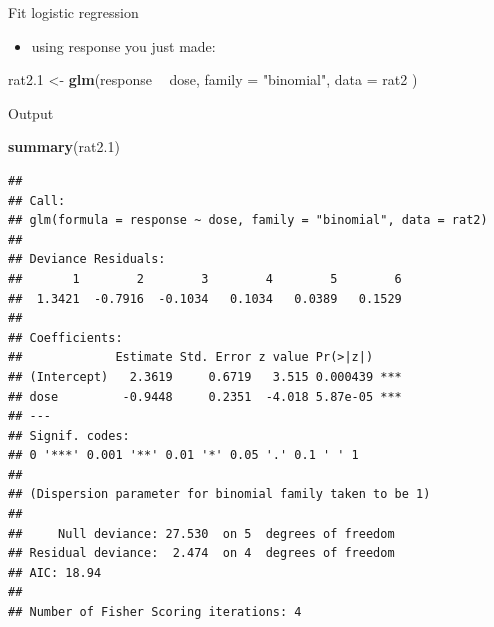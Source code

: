 \documentclass[
  ignorenonframetext,
]{beamer}
\newenvironment{Shaded}{\begin{snugshade}}{\end{snugshade}}
\newcommand{\DataTypeTok}[1]{\textcolor[rgb]{0.13,0.29,0.53}{#1}}
\newcommand{\FloatTok}[1]{\textcolor[rgb]{0.00,0.00,0.81}{#1}}
\newcommand{\KeywordTok}[1]{\textcolor[rgb]{0.13,0.29,0.53}{\textbf{#1}}}
\newcommand{\NormalTok}[1]{#1}
\newcommand{\OperatorTok}[1]{\textcolor[rgb]{0.81,0.36,0.00}{\textbf{#1}}}
\newcommand{\StringTok}[1]{\textcolor[rgb]{0.31,0.60,0.02}{#1}}
\providecommand{\tightlist}{%
  \setlength{\itemsep}{0pt}\setlength{\parskip}{0pt}}
\begin{document}
\begin{frame}[fragile]{Fit logistic regression}
\protect\hypertarget{fit-logistic-regression}{}

\begin{itemize}
\tightlist
\item
  using response you just made:
\end{itemize}

\begin{Shaded}
\begin{Highlighting}[]
\NormalTok{rat2}\FloatTok{.1}\NormalTok{ <-}\StringTok{ }\KeywordTok{glm}\NormalTok{(response }\OperatorTok{~}\StringTok{ }\NormalTok{dose,}
  \DataTypeTok{family =} \StringTok{"binomial"}\NormalTok{,}
  \DataTypeTok{data =}\NormalTok{ rat2}
\NormalTok{)}
\end{Highlighting}
\end{Shaded}

\end{frame}

\begin{frame}[fragile]{Output}
\protect\hypertarget{output-2}{}

\scriptsize

\begin{Shaded}
\begin{Highlighting}[]
\KeywordTok{summary}\NormalTok{(rat2}\FloatTok{.1}\NormalTok{)}
\end{Highlighting}
\end{Shaded}

\begin{verbatim}
## 
## Call:
## glm(formula = response ~ dose, family = "binomial", data = rat2)
## 
## Deviance Residuals: 
##       1        2        3        4        5        6  
##  1.3421  -0.7916  -0.1034   0.1034   0.0389   0.1529  
## 
## Coefficients:
##             Estimate Std. Error z value Pr(>|z|)    
## (Intercept)   2.3619     0.6719   3.515 0.000439 ***
## dose         -0.9448     0.2351  -4.018 5.87e-05 ***
## ---
## Signif. codes:  
## 0 '***' 0.001 '**' 0.01 '*' 0.05 '.' 0.1 ' ' 1
## 
## (Dispersion parameter for binomial family taken to be 1)
## 
##     Null deviance: 27.530  on 5  degrees of freedom
## Residual deviance:  2.474  on 4  degrees of freedom
## AIC: 18.94
## 
## Number of Fisher Scoring iterations: 4
\end{verbatim}

\normalsize

\end{frame}
\end{document}
